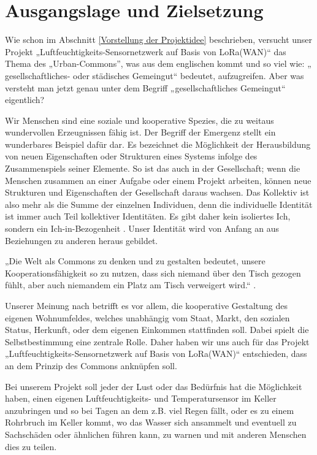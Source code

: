 \section{Ausgangslage und Zielsetzung} \label{Ausgangslage und Zielsetzung}

Wie schon im Abschnitt \ref{Vorstellung der Projektidee} beschrieben, versucht unser Projekt „Luftfeuchtigkeits-Sensornetzwerk auf Basis von LoRa(WAN)“ das Thema des „Urban-Commons”, was aus dem englischen kommt und so viel wie: „ gesellschaftliches- oder städisches Gemeingut“ bedeutet, aufzugreifen. Aber was versteht man jetzt genau unter dem Begriff „gesellschaftliches Gemeingut“ eigentlich?  

Wir Menschen sind eine soziale und kooperative Spezies, die zu weitaus wundervollen Erzeugnissen fähig ist. Der Begriff der Emergenz stellt ein wunderbares Beispiel dafür dar. Es bezeichnet die Möglichkeit der Herausbildung von neuen Eigenschaften oder Strukturen eines Systems infolge des Zusammenspiels seiner Elemente. So ist das auch in der Gesellschaft; wenn die Menschen zusammen an einer Aufgabe oder einem Projekt arbeiten, können neue Strukturen und Eigenschaften der Gesellschaft daraus wachsen. Das Kollektiv ist also mehr als die Summe der einzelnen Individuen, denn die individuelle Identität ist immer auch Teil kollektiver Identitäten. Es gibt daher kein isoliertes Ich, sondern ein Ich-in-Bezogenheit \cite{Bollier2019}. Unser Identität wird von Anfang an aus Beziehungen zu anderen heraus gebildet.  

„Die Welt als Commons zu denken und zu gestalten bedeutet, unsere Kooperationsfähigkeit so zu nutzen, dass sich niemand über den Tisch gezogen fühlt, aber auch niemandem ein Platz am Tisch verweigert wird.“ \cite{Bollier2019}. 

Unserer Meinung nach betrifft es vor allem, die kooperative Gestaltung des eigenen Wohnumfeldes, welches unabhängig vom Staat, Markt, den sozialen Status, Herkunft, oder dem eigenen Einkommen stattfinden soll. Dabei spielt die Selbstbestimmung eine zentrale Rolle. Daher haben wir uns auch für das Projekt „Luftfeuchtigkeits-Sensornetzwerk auf Basis von LoRa(WAN)“ entschieden, dass an dem Prinzip des Commons anknüpfen soll.  

Bei unserem Projekt soll jeder der Lust oder das Bedürfnis hat die Möglichkeit haben, einen eigenen Luftfeuchtigkeits- und Temperatursensor im Keller anzubringen und so bei Tagen an dem z.B. viel Regen fällt, oder es zu einem Rohrbruch im Keller kommt, wo das Wasser sich ansammelt und eventuell zu Sachschäden oder ähnlichen führen kann, zu warnen und mit anderen Menschen dies zu teilen.  

